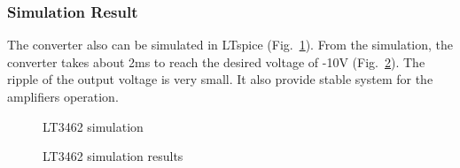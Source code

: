 \subsubsection{Simulation Result}
The converter also can be simulated in LTspice (Fig.~\ref{fig:LT3462_ltspice}). From the simulation, the converter takes about 2ms to reach the desired voltage of -10V (Fig.~\ref{fig:LT3462_sim}). The ripple of the output voltage is very small. It also provide stable system for the amplifiers operation.
\begin{figure}[!tbh]
	\centering
	\caption{LT3462 simulation}
	\label{fig:LT3462_ltspice}
\end{figure}
\begin{figure}[!tbh]
	\centering
	\caption{LT3462 simulation results}
	\label{fig:LT3462_sim}
\end{figure}




